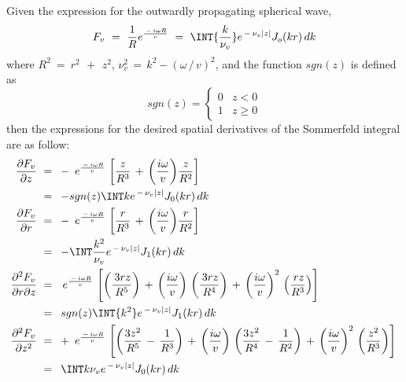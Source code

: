 \documentclass{article}
\begin{document}
Given the expression for the outwardly propagating spherical wave,
$$ 
F_v \   = \  { \frac{1 }{ R }} e^{ \frac{ \,-\,i \omega R   }{ v }} \ =\  \INT
 { \frac{k }{  \nu_v } } e^{ \,-\, \nu_v |  z | } J_o ( kr ) \, dk
$$
where
$R^2 \   = \  r^2 \ \,+\,\   {  z }^2 $,
$ \nu_v^2 \,=\, k^2 - ( \omega \,/\, v )^2 $,
and
the function $  sgn(z) $ is defined as
$$
 sgn(z) = 
\begin{cases}
 0 & z < 0 \\
 1 & z \ge 0
\end{cases}
$$
then the expressions for the desired spatial derivatives of the Sommerfeld integral are as follow:
\begin{equation*}
\begin{aligned}
 \frac{ \partial F_v   }{  \partial  z }  \   &= \   \,-\,\ { e^{ \frac{ \,-\,i \omega R   }{ v }} } \, \left[  {  \frac{z }{  R^3 } }  \,+\, { \left( {\frac{ i \omega   }{ v }}  \right) }  {  \frac{z }{  R^2 } }  \right] \\
 \,&=\, \  - sgn (z) \INT  k e^{ \,-\, \nu_v |  z | } J_0 ( kr ) \, dk \\
{ \frac{ \partial F_v   }{  \partial r } } \   &= \  \,-\,\ { e^{ \frac{ \,-\,i \omega R   }{ v }} } \, \left[  { \frac{r }{  R^3 } }  \,+\, { \left( {\frac{ i \omega   }{ v }}  \right) }  { \frac{r }{  R^2 } }  \right] \\
 \,&=\, \  - \INT  \frac{ k^2   }{  \nu_v } e^{ \,-\, \nu_v |  z | } J_1 ( kr ) \, dk \\
{ \frac{ \partial^2 F_v   }{  \partial r \partial {\it z} } } \   &= \  \ { e^{ \frac{ \,-\,i \omega R   }{ v }} } \, \left[  \left( \frac{ \,3r  z   }{  R^5 } \right)  \,+\, { \left( {\frac{ i \omega   }{ v }}  \right) } \,  \left( \frac{ \,3r  z   }{  R^4 } \right)  \,+\, { \left( {\frac{ i \omega   }{ v }}  \right) }^2 \,  \left( \frac{ \,r  z   }{  R^3 } \right)  \right] \, \\
 \,&=\, \    sgn (z) \INT  { k^2 }  e^{ \,-\, \nu_v |  z | } J_1 ( kr ) \, dk \\
{ \frac{ \partial^2 F_v   }{  \partial {\it z}^2 } } \   &= \  \,+\,\ { e^{ \frac{ \,-\,i \omega R   }{ v }} } \, \left[  \left( \frac{ 3   z^2   }{  R^5 } \,-\, \frac{ 1   }{  R^3 } \right)  \,+\, { \left( {\frac{ i \omega   }{ v }}  \right) } \,  \left( \frac{ 3   z^2   }{  R^4 } \,-\, \frac{ 1   }{  R^2 } \right)  \,+\, { \left( {\frac{ i \omega   }{ v }}  \right) }^2 \,  \left( \frac{   z^2   }{  R^3 } \right)  \right] \, \\
 \,&=\, \    \INT  k \nu_v  e^{ \,-\, \nu_v |  z | } J_0 ( kr ) \, dk \\

\end{aligned}
\end{equation*}
\end{document}
